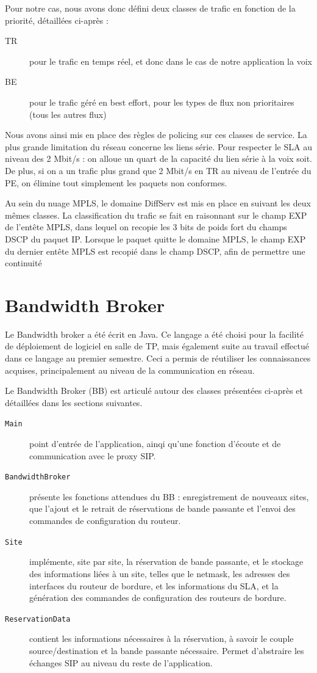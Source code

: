 \documentclass[a4paper,11pt]{article}
\let\Oldsection\section
\renewcommand{\section}{\FloatBarrier\Oldsection}
\begin{document}
Pour notre cas, nous avons donc défini deux classes de trafic en fonction de la priorité, détaillées ci-après : 
\begin{description}
    \item[TR] pour le trafic en temps réel, et donc dans le cas de notre application la voix
    \item[BE] pour le trafic géré en best effort, pour les types de flux non prioritaires (tous les autres flux)
\end{description}

Nous avons ainsi mis en place des règles de policing sur ces classes de service. La plus grande limitation du réseau concerne les liens série. Pour respecter le SLA au niveau des 2 Mbit/s : on alloue un quart de la capacité du lien série à la voix soit. De plus, si on a un trafic plus grand que 2 Mbit/s en TR au niveau de l'entrée du PE, on élimine tout simplement les paquets non conformes. 

Au sein du nuage MPLS, le domaine DiffServ est mis en place en suivant les deux mêmes classes. La classification du trafic se fait en raisonnant sur le champ EXP de l’entête MPLS, dans lequel on recopie les 3 bits de poids fort du champs DSCP du paquet IP. Lorsque le paquet quitte le domaine MPLS, le champ EXP du dernier entête MPLS est recopié dans le champ DSCP, afin de permettre une continuité


\section{Bandwidth Broker}
\label{sec:BB}
Le Bandwidth broker a été écrit en Java. Ce langage a été choisi pour la facilité de déploiement de logiciel en salle de TP, mais également suite au travail effectué dans ce langage au premier semestre. Ceci a permis de réutiliser les connaissances acquises, principalement au niveau de la communication en réseau.

Le Bandwidth Broker (BB) est articulé autour des classes présentées ci-après et détaillées dans les sections suivantes.

\begin{description}
    \item[\texttt{Main}] point d'entrée de l'application, ainqi qu'une fonction d'écoute et de communication avec le proxy SIP.
    \item[\texttt{BandwidthBroker}] présente les fonctions attendues du BB : enregistrement de nouveaux sites, que l'ajout et le retrait de réservations de bande passante et l'envoi des commandes de configuration du routeur.
    \item[\texttt{Site}] implémente, site par site, la réservation de bande passante, et le stockage des informations liées à un site, telles que le netmask, les adresses des interfaces du routeur de bordure, et les informations du SLA, et la génération des commandes de configuration des routeurs de bordure.
    \item[\texttt{ReservationData}] contient les informations nécessaires à la réservation, à savoir le couple source\slash destination et la bande passante nécessaire. Permet d'abstraire les échanges SIP au niveau du reste de l'application.
\end{description}
\end{document}
